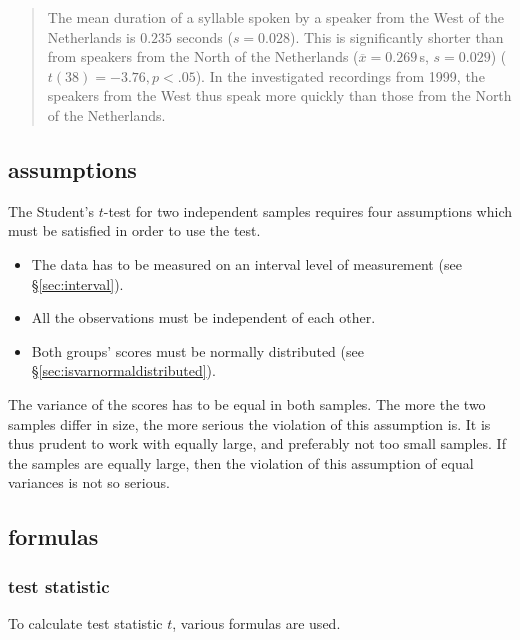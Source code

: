\documentclass[
]{book}
\begin{document}
\begin{quote}
The mean duration of a syllable spoken by a speaker from the West
of the Netherlands is \(0.235\) seconds (\(s=0.028\)). This is
significantly shorter than from speakers from the North of the Netherlands
(\(\overline{x}=0.269\) s, \(s=0.029\)) (\(t(38)=-3.76, p<.05\)). In the
investigated recordings from 1999, the speakers from the West thus
speak more quickly than those from the North of the Netherlands.
\end{quote}

\hypertarget{assumptions}{%
\subsection{assumptions}\label{assumptions}}

The Student's \(t\)-test for two independent samples requires four assumptions
which must be satisfied in order to use the test.

\begin{itemize}
\item
  The data has to be measured on an interval level of measurement (see
  §\ref{sec:interval}).
\item
  All the observations must be independent of each other.
\item
  Both groups' scores must be normally distributed (see
  §\ref{sec:isvarnormaldistributed}).
\end{itemize}

The variance of the scores has to be equal in both
samples. The more the two samples differ in size, the more
serious the violation of this assumption is. It is thus prudent
to work with equally large, and preferably not too small samples. If the
samples are equally large, then the violation of this assumption of equal
variances is not so serious.

\hypertarget{sec:ttest-formulas}{%
\subsection{formulas}\label{sec:ttest-formulas}}

\hypertarget{test-statistic}{%
\subsubsection{test statistic}\label{test-statistic}}

To calculate test statistic \(t\), various formulas are used.
\end{document}
